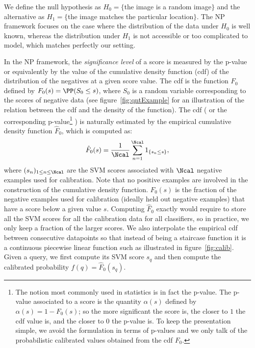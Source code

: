       We define the null hypothesis as $H_0=\{$the image is a random image$\}$ and the alternative as $H_1=\{$the image matches the particular location$\}$. The NP framework focuses on the case where the distribution of the data under $H_0$ is well known, whereas the distribution under $H_1$ is not accessible or too complicated to model, which matches perfectly our setting.

      In the NP framework, the \emph{significance level} of a score is measured by the p-value or equivalently by the value of the cumulative density function  (cdf) of the distribution of the negatives at a given score value. The cdf is the function $F_0$ defined by $F_0(s)=\PP(S_0\leq s)$, where $S_0$ is a random variable corresponding to the scores of negative data (see figure~\ref{fig:qntExample} for an illustration of the relation between the cdf and the density of the function). The cdf 
      (
        or the corresponding p-value\footnote{
            The notion most commonly used in statistics is in fact the p-value. The p-value associated to a score is the quantity $\alpha(s)$ defined by $\alpha(s)=1-F_0(s)$; so the more significant the score is, the closer to $1$ the cdf value is, and the closer to $0$ the p-value is. To keep the presentation simple, we avoid the formulation in terms of p-values and we only talk of the probabilistic calibrated values obtained from the cdf $F_0$.
       }
      )
      is naturally estimated by the empirical cumulative density function $\hat{F}_0$, which is computed as: 
      \begin{equation}
        \hat{F}_0(s)=\frac{1}{\Ncal} \sum_{n=1}^{\Ncal} 1_{\{s_n \leq s\}},
        \label{eq:empiricalCDF}
      \end{equation}
      \noindent
      where $(s_n)_{1\leq n \leq \Ncal }$ are the SVM scores associated with $\Ncal$ negative examples used for calibration. Note that no positive examples are involved in the construction of the cumulative density function.
      $\hat{F}_0(s)$ is the fraction of the negative examples used for calibration (ideally held out negative examples) that have a score below a given value $s$.
      Computing $\hat{F}_0$ exactly would require to store all the SVM scores for all the calibration data for all classifiers, so in practice, we only keep a fraction of the larger scores.
      We also interpolate the empirical cdf between consecutive datapoints so that instead of being a staircase function it is a continuous piecewise linear function such as illustrated in figure~\ref{fig:calib}. Given a query, we first compute its SVM score $s_q$ and then compute the calibrated probability $f(q)=\hat{F}_0(s_q)$.
